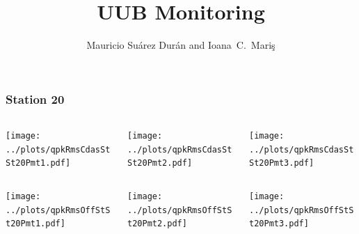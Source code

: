 \documentclass[aspectratio=169]{beamer}
\title{UUB Monitoring}
\author{
  Mauricio Su\'arez Dur\'an and Ioana~C.~Mari\c{s}
}
\institute{IIHE-ULB}
\begin{document}
\begin{frame}
  \titlepage
\end{frame}
\begin{frame} 
  \frametitle{Station 20}
  \begin{center}
    \begin{columns}
      \begin{column}{0.33\textwidth}
        \texttt{[image: ../plots/qpkRmsCdasStSt20Pmt1.pdf]}
      \end{column}
      \begin{column}{0.33\textwidth}
        \texttt{[image: ../plots/qpkRmsCdasStSt20Pmt2.pdf]}
      \end{column}
      \begin{column}{0.33\textwidth}
        \texttt{[image: ../plots/qpkRmsCdasStSt20Pmt3.pdf]}
      \end{column}
    \end{columns}
  \end{center}

  \begin{center}
    \begin{columns}
      \begin{column}{0.33\textwidth}
        \texttt{[image: ../plots/qpkRmsOffStSt20Pmt1.pdf]}
      \end{column}
      \begin{column}{0.33\textwidth}
        \texttt{[image: ../plots/qpkRmsOffStSt20Pmt2.pdf]}
      \end{column}
      \begin{column}{0.33\textwidth}
        \texttt{[image: ../plots/qpkRmsOffStSt20Pmt3.pdf]}
      \end{column}
    \end{columns}
  \end{center}
\end{frame}
\end{document}

